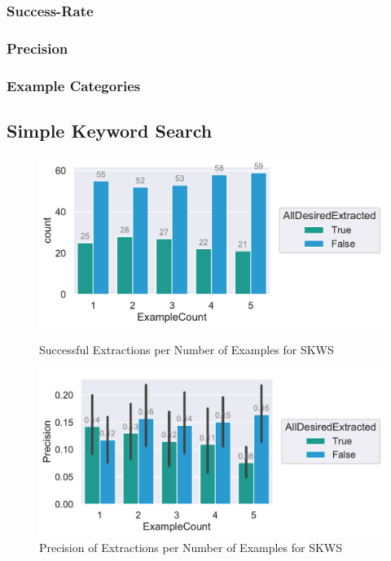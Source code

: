 \documentclass[\myrootdir/main.tex]{subfiles}
\begin{document}
\subsubsection{Success-Rate}
\subsubsection{Precision}
\subsubsection{Example Categories}


\subsection{Simple Keyword Search}

\begin{figure}[htbp]
	\centering
	\begin{minipage}{0.45\textwidth}
		\centering
		\includegraphics[width=\textwidth, clip]{img/big-study/success-examples-kw.pdf}
		\caption{Successful Extractions per Number of Examples for SKWS}
		\label{fig:success-examples-kw}
	\end{minipage}\hfill
	\begin{minipage}{0.45\textwidth}
		\centering
		\includegraphics[width=\textwidth, clip]{img/big-study/precision-kw.pdf}
		\caption{Precision of Extractions per Number of Examples for SKWS}
		\label{fig:precision-kw}
	\end{minipage}
\end{figure}
\end{document}
